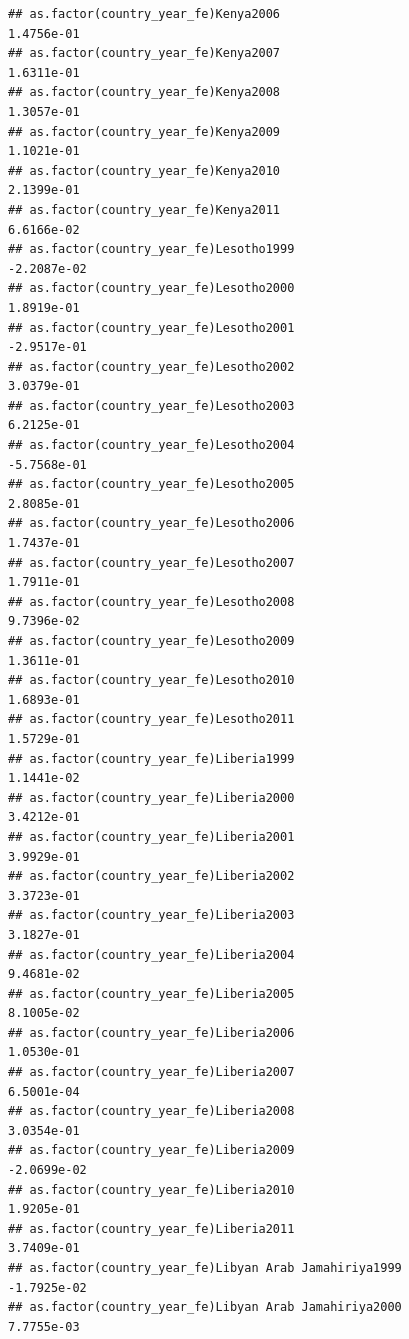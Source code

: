 \documentclass[
  a4paper,
]{article}
\begin{document}
\begin{verbatim}
## as.factor(country_year_fe)Kenya2006                             1.4756e-01
## as.factor(country_year_fe)Kenya2007                             1.6311e-01
## as.factor(country_year_fe)Kenya2008                             1.3057e-01
## as.factor(country_year_fe)Kenya2009                             1.1021e-01
## as.factor(country_year_fe)Kenya2010                             2.1399e-01
## as.factor(country_year_fe)Kenya2011                             6.6166e-02
## as.factor(country_year_fe)Lesotho1999                          -2.2087e-02
## as.factor(country_year_fe)Lesotho2000                           1.8919e-01
## as.factor(country_year_fe)Lesotho2001                          -2.9517e-01
## as.factor(country_year_fe)Lesotho2002                           3.0379e-01
## as.factor(country_year_fe)Lesotho2003                           6.2125e-01
## as.factor(country_year_fe)Lesotho2004                          -5.7568e-01
## as.factor(country_year_fe)Lesotho2005                           2.8085e-01
## as.factor(country_year_fe)Lesotho2006                           1.7437e-01
## as.factor(country_year_fe)Lesotho2007                           1.7911e-01
## as.factor(country_year_fe)Lesotho2008                           9.7396e-02
## as.factor(country_year_fe)Lesotho2009                           1.3611e-01
## as.factor(country_year_fe)Lesotho2010                           1.6893e-01
## as.factor(country_year_fe)Lesotho2011                           1.5729e-01
## as.factor(country_year_fe)Liberia1999                           1.1441e-02
## as.factor(country_year_fe)Liberia2000                           3.4212e-01
## as.factor(country_year_fe)Liberia2001                           3.9929e-01
## as.factor(country_year_fe)Liberia2002                           3.3723e-01
## as.factor(country_year_fe)Liberia2003                           3.1827e-01
## as.factor(country_year_fe)Liberia2004                           9.4681e-02
## as.factor(country_year_fe)Liberia2005                           8.1005e-02
## as.factor(country_year_fe)Liberia2006                           1.0530e-01
## as.factor(country_year_fe)Liberia2007                           6.5001e-04
## as.factor(country_year_fe)Liberia2008                           3.0354e-01
## as.factor(country_year_fe)Liberia2009                          -2.0699e-02
## as.factor(country_year_fe)Liberia2010                           1.9205e-01
## as.factor(country_year_fe)Liberia2011                           3.7409e-01
## as.factor(country_year_fe)Libyan Arab Jamahiriya1999           -1.7925e-02
## as.factor(country_year_fe)Libyan Arab Jamahiriya2000            7.7755e-03

\end{verbatim}
\end{document}
